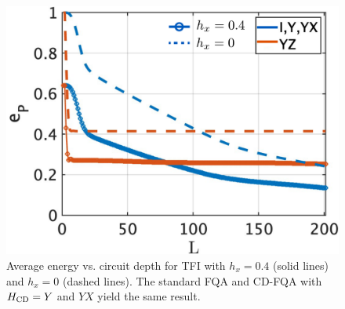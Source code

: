 \documentclass[twocolumn,aps,superscriptaddress,floatfix,longbibliography]{revtex4-2}
\newcommand{\awc}[1]{{\color[rgb]{.8,.6,.6}{[AW: {\it #1}\,]}}}
\newcommand{\App}[1]{App.\,\ref{#1}}
\newcommand{\Fig}[1]{Fig.\,\ref{fig:#1}}
\def\YX{\ensuremath{\mathit{YX}}\xspace} %
\begin{document}


\begin{figure}[tbh!]
\centering
\includegraphics[scale=0.185]{TFIM.pdf}
\caption{
   Average energy %
   vs. circuit depth for TFI with  $h_x=0.4$ (solid lines)
   and $h_x=0$ (dashed lines). The standard FQA and CD-FQA with $H_{\rm CD}=Y$ and $YX$ yield the same result. 
}\label{fig:TFI}
\end{figure}
\end{document}
